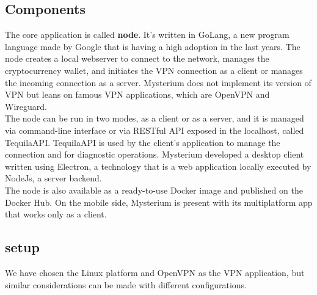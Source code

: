 \documentclass[]{article}
\begin{document}
	\subsection{Components}

	The core application is called \textbf{node}. It's written in GoLang, a new program language made by Google that is having a high adoption in the last years. The node creates a local webserver to connect to the network, manages the cryptocurrency wallet, and initiates the VPN connection as a client or manages the incoming connection as a server. Mysterium does not implement its version of VPN but leans on famous VPN applications, which are OpenVPN and Wireguard.\\
	The node can be run in two modes, as a client or as a server, and it is managed via command-line interface or via RESTful API exposed in the localhost, called TequilaAPI. TequilaAPI is used by the client's application to manage the connection and for diagnostic operations. Mysterium developed a desktop client written using Electron, a technology that is a web application locally executed by NodeJs, a server backend.\\
	The node is also available as a ready-to-use Docker image and published on the Docker Hub. 
	On the mobile side, Mysterium is present with its multiplatform app that works only as a client.\\

	\subsection{setup}

	We have chosen the Linux platform and OpenVPN as the VPN application, but similar considerations can be made with different configurations.\\
\end{document}
